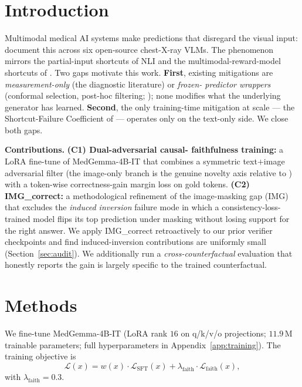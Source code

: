 \documentclass{article}
\begin{document}
\section{Introduction}
\label{sec:intro}

Multimodal medical AI systems make predictions that disregard the visual
input: \citet{restrepo2025sms} document this across six open-source
chest-X-ray VLMs. The phenomenon mirrors the partial-input shortcuts of
NLI \citep{gururangan2018annotation, poliak2018hypothesis} and the
multimodal-reward-model shortcuts of \citet{li2025sfc}. Two gaps motivate
this work. \textbf{First}, existing mitigations are
\emph{measurement-only} (the diagnostic literature) or \emph{frozen-
predictor wrappers} (conformal selection, post-hoc filtering;
\citealp{gui2024conformal, li2025conflvlm, mohri2024conformal}); none
modifies what the underlying generator has learned. \textbf{Second},
the only training-time mitigation at scale --- the Shortcut-Failure
Coefficient of \citet{li2025sfc} --- operates only on the text-only
side. We close both gaps.

\textbf{Contributions.} \textbf{(C1) Dual-adversarial causal-
faithfulness training:} a LoRA fine-tune of MedGemma-4B-IT
\citep{google2024medgemma} that combines a symmetric text$+$image
adversarial filter (the image-only branch is the genuine novelty axis
relative to \citealp{li2025sfc}) with a token-wise correctness-gain
margin loss on gold tokens. \textbf{(C2) IMG\_correct:} a methodological
refinement of the image-masking gap (IMG) that excludes the
\emph{induced inversion} failure mode in which a consistency-loss-
trained model flips its top prediction under masking without losing
support for the right answer. We apply IMG\_correct retroactively to our
prior verifier checkpoints and find induced-inversion contributions are
uniformly small (Section~\ref{sec:audit}). We additionally run a
\emph{cross-counterfactual} evaluation that honestly reports the gain is
largely specific to the trained counterfactual.

\section{Methods}
\label{sec:methods}

We fine-tune MedGemma-4B-IT (LoRA rank $16$ on q/k/v/o projections;
$11.9$\,M trainable parameters; full hyperparameters in
Appendix~\ref{app:training}). The training objective is
\begin{equation}
\mathcal{L}(x) = w(x)\cdot\mathcal{L}_{\mathrm{SFT}}(x) +
\lambda_{\mathrm{faith}}\cdot\mathcal{L}_{\mathrm{faith}}(x),
\end{equation}
with $\lambda_{\mathrm{faith}} = 0.3$.
\end{document}
